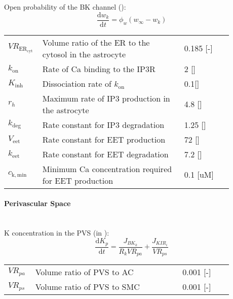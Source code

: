 %
Open probability of the BK channel (\pers):
\begin{equation} \label{eq:dwkdt}
\frac{\mathrm{d}w_{k}}{\mathrm{d}t} = \phi_{w} \left(w_{\infty}-w_{k} \right) 
\end{equation}
%
\begin{table}[h!]
	\centering
	\begin{tabular}{| p{0.09\linewidth} | >{\footnotesize} p{0.6\linewidth} | >{\footnotesize} p{0.17\linewidth} | >{\footnotesize} p{0.02\linewidth} |}
		\arrayrulecolor{lightgrey}\hline
		$ VR_{\mathrm{ER_{\mathrm{cyt}}}} $  & Volume ratio of the \gls{ER} to the cytosol in the astrocyte  & 0.185 [-] & \cite{} \\
		$k_{\mathrm{on}} $         & Rate of \gls{Ca} binding to the \gls{IP3}R  & 2 [\uMps] &  \cite{} \\
		$K_{\mathrm{inh}}$          & Dissociation rate of $k_{\mathrm{on}}$  & 0.1[\uM] & \cite{} \\
		$r_h$                      & Maximum rate of \gls{IP3} production in the astrocyte  &  4.8 [\uM] & \cite{} \\
		$k_{\mathrm{deg}}$          & Rate constant for \gls{IP3} degradation  &  1.25 [\pers] & \cite{} \\
		$V_{\mathrm{eet}} $        & Rate constant for EET production   & 72 [\uM] & \cite{} \\
		$k_{\mathrm{eet}}$         & Rate constant for EET degradation  & 7.2 [\uM] & \cite{} \\
		$c_{\mathrm{k,min}}$       & Minimum \gls{Ca} concentration required for EET production & 0.1 [uM] & \cite{} \\			
		\hline
	\end{tabular}
\end{table}
%
\paragraph{Perivascular Space}~\\
\gls{K} concentration in the PVS  (in \uM):
\begin{equation} \label{eq:K_p}
\dfrac{\mathrm{d}K_{p}}{\mathrm{d}t}= \frac{J_{BK_k}}{R_k VR_{pa}} + \frac{J_{KIR_i}}{ VR_{ps}}
\end{equation}
%
\begin{table}[h!]
\centering
\begin{tabular}{| p{0.09\linewidth} | >{\footnotesize} p{0.6\linewidth} | >{\footnotesize} p{0.17\linewidth} | >{\footnotesize} p{0.02\linewidth} |}
\arrayrulecolor{lightgrey}\hline
$ VR_{pa} $  & Volume ratio of PVS to AC & 0.001 [-] & \cite{LoesEvert} \\
$ VR_{ps} $  & Volume ratio of PVS to SMC & 0.001 [-] & \cite{LoesEvert} \\
\hline
\end{tabular}
\end{table}

